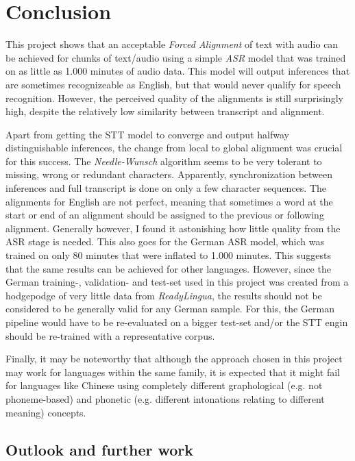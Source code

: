\section{Conclusion}\label{conclusion}

This project shows that an acceptable \textit{Forced Alignment} of text with audio can be achieved for chunks of text/audio using a simple \textit{ASR} model that was trained on as little as 1.000 minutes of audio data. This model will output inferences that are sometimes recognizeable as English, but that would never qualify for speech recognition. However, the perceived quality of the alignments is still surprisingly high, despite the relatively low similarity between transcript and alignment. 

Apart from getting the \ac{STT} model to converge and output halfway distinguishable inferences, the change from local to global alignment was crucial for this success. The \textit{Needle-Wunsch} algorithm seems to be very tolerant to missing, wrong or redundant characters. Apparently, synchronization between inferences and full transcript is done on only a few character sequences. The alignments for English are not perfect, meaning that sometimes a word at the start or end of an alignment should be assigned to the previous or following alignment. Generally however, I found it astonishing how little quality from the \ac{ASR} stage is needed. This also goes for the German \ac{ASR} model, which was trained on only 80 minutes that were inflated to 1.000 minutes. This suggests that the same results can be achieved for other languages. However, since the German training-, validation- and test-set used in this project was created from a hodgepodge of very little data from \textit{ReadyLingua}, the results should not be considered to be generally valid for any German sample. For this, the German pipeline would have to be re-evaluated on a bigger test-set and/or the \ac{STT} engin should be re-trained with a representative corpus.

Finally, it may be noteworthy that although the approach chosen in this project may work for languages within the same family, it is expected that it might fail for languages like Chinese using completely different graphological (e.g. not phoneme-based) and phonetic (e.g. different intonations relating to different meaning) concepts.

\subsection{Outlook and further work}

